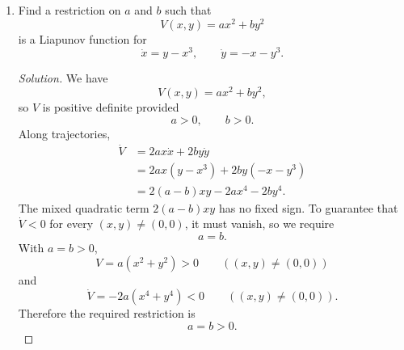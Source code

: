 \documentclass[12pt]{amsart}
\theoremstyle{plain}
\theoremstyle{definition}
\theoremstyle{definition}
\theoremstyle{plain}
\newenvironment{solution}
{\begin{proof}[Solution]}
{\end{proof}}
\begin{document}
\begin{enumerate}
\begin{solution}
\begin{enumerate}[label=(\alph*)]
        \item Let
        \[
            f(x,y)=y,
            \qquad
            g(x,y)=x-x^3-\mu y.
        \]
        Its divergence is
        \[
            f_x+g_y=0-\mu=-\mu.
        \]
        If $\mu>0$, then
        \[
            f_x+g_y=-\mu<0
        \]
        everywhere in the plane. Since the divergence has one strict sign on the
        simply connected plane, Bendixson's criterion rules out every nonconstant
        closed orbit. Thus the damped Duffing oscillator has no periodic orbit for
        $\mu>0$.
            \end{enumerate}
        \end{solution}

        \item Find a restriction on $a$ and $b$ such that
        \[
            V(x,y)=ax^2+by^2
        \]
        is a Liapunov function for
        \[
            \dot x=y-x^3,
            \qquad
            \dot y=-x-y^3.
        \]

        \begin{solution}
            We have
            \[
                V(x,y)=ax^2+by^2,
            \]
            so $V$ is positive definite provided
            \[
                a>0,\qquad b>0.
            \]
            Along trajectories,
            \begin{align*}
                \dot V
                &=2ax\dot x+2by\dot y\\
                &=2ax(y-x^3)+2by(-x-y^3)\\
                &=2(a-b)xy-2ax^4-2by^4.
            \end{align*}
            The mixed quadratic term $2(a-b)xy$ has no fixed sign. To guarantee that
            $\dot V<0$ for every $(x,y)\neq(0,0)$, it must vanish, so we require
            \[
                a=b.
            \]
            With $a=b>0$,
            \[
                V=a(x^2+y^2)>0\qquad ((x,y)\neq(0,0))
            \]
            and
            \[
                \dot V=-2a(x^4+y^4)<0\qquad ((x,y)\neq(0,0)).
            \]
            Therefore the required restriction is
            \[
                a=b>0.
            \]
        \end{solution}
    \end{enumerate}
\end{document}
